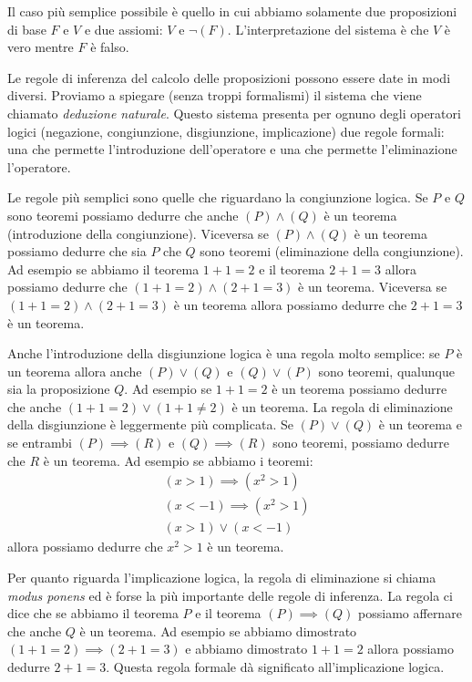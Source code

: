 Il caso più semplice possibile è quello in cui abbiamo 
solamente due proposizioni di base $F$ e $V$ e due assiomi: 
$V$ e $\lnot (F)$. 
L'interpretazione del sistema è che $V$ è vero mentre $F$ è falso.

Le regole di inferenza del calcolo delle proposizioni
possono essere date in modi diversi. 
%
%
Proviamo a spiegare (senza troppi formalismi) il sistema 
che viene chiamato \emph{deduzione naturale}. 
Questo sistema presenta per ognuno degli operatori logici
(negazione, congiunzione, disgiunzione, implicazione) 
due regole formali: una che permette l'introduzione dell'operatore e una 
che permette l'eliminazione l'operatore.

Le regole più semplici sono quelle che riguardano la congiunzione 
logica. Se $P$ e $Q$ sono teoremi possiamo dedurre che anche 
$(P)\land (Q)$ è un teorema (introduzione della congiunzione).
%
%
%
Viceversa se $(P)\land (Q)$ è un teorema possiamo dedurre 
che sia $P$ che $Q$ sono teoremi (eliminazione della congiunzione).
%
%
Ad esempio se abbiamo il teorema $1+1=2$ e il teorema $2+1=3$ 
allora possiamo dedurre che $(1+1=2) \land (2+1=3)$ è un teorema.
Viceversa se $(1+1=2)\land (2+1=3)$ è un teorema allora possiamo 
dedurre che $2+1=3$ è un teorema.

Anche l'introduzione della disgiunzione logica è una regola 
%
molto semplice: se $P$ è un teorema allora anche $(P)\lor (Q)$ 
e $(Q)\lor (P)$ sono teoremi, qualunque sia la proposizione $Q$.
%
%
Ad esempio se $1+1=2$ è un teorema possiamo dedurre 
che anche $(1+1=2) \lor (1+1\neq 2)$ è un teorema.
La regola di eliminazione della disgiunzione è leggermente 
%
più complicata. Se  $(P)\lor (Q)$ è un teorema e se entrambi 
$(P)\implies (R)$ e $(Q)\implies (R)$ sono teoremi, possiamo 
dedurre che $R$ è un teorema.
Ad esempio se abbiamo i teoremi: 
\[
\begin{gathered}
  (x>1) \implies (x^2>1)\\ 
  (x<-1) \implies (x^2>1)\\  
  (x>1) \lor (x<-1)
\end{gathered}
\]
allora possiamo dedurre che $x^2>1$ 
è un teorema.

Per quanto riguarda l'implicazione logica, la regola di eliminazione 
%
si chiama \emph{modus ponens} ed è forse la più importante 
%
%
delle regole di inferenza.
La regola ci dice che se abbiamo il teorema 
$P$ e il teorema $(P)\implies (Q)$ possiamo affernare che anche 
$Q$ è un teorema.
Ad esempio se abbiamo dimostrato $(1+1=2) \implies (2+1=3)$ 
e abbiamo dimostrato $1+1=2$ allora possiamo dedurre $2+1=3$.
Questa regola formale dà significato all'implicazione logica.

